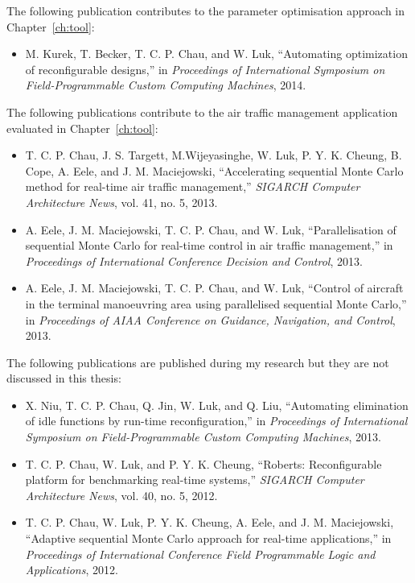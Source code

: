 \begin{publications}
The following publication contributes to the parameter optimisation approach in Chapter~\ref{ch:tool}:
\begin{itemize}
\item M. Kurek, T. Becker, T. C. P. Chau, and W. Luk, ``Automating optimization of reconfigurable designs,'' in \textit{Proceedings of International Symposium on Field-Programmable Custom Computing Machines}, 2014.%
\end{itemize}

\pagebreak
The following publications contribute to the air traffic management application evaluated in Chapter~\ref{ch:tool}:
\begin{itemize}
\item T. C. P. Chau, J. S. Targett, M.Wijeyasinghe, W. Luk, P. Y. K. Cheung, B. Cope, A. Eele, and J. M. Maciejowski, ``Accelerating sequential Monte Carlo method for real-time air traffic management,'' \textit{SIGARCH Computer Architecture News}, vol. 41, no. 5, 2013.
\item A. Eele, J. M. Maciejowski, T. C. P. Chau, and W. Luk, ``Parallelisation of sequential Monte Carlo for real-time control in air traffic management,'' in \textit{Proceedings of International Conference Decision and Control}, 2013.
\item A. Eele, J. M. Maciejowski, T. C. P. Chau, and W. Luk, ``Control of aircraft in the terminal manoeuvring area using parallelised sequential Monte Carlo,'' in \textit{Proceedings of AIAA Conference on Guidance, Navigation, and Control}, 2013.
\end{itemize}

The following publications are published during my research but they are not discussed in this thesis:
\begin{itemize}
\item X. Niu, T. C. P. Chau, Q. Jin, W. Luk, and Q. Liu, ``Automating elimination of idle functions by run-time reconfiguration,'' in \textit{Proceedings of International Symposium on Field-Programmable Custom Computing Machines}, 2013.%
\item T. C. P. Chau, W. Luk, and P. Y. K. Cheung, ``Roberts: Reconfigurable platform for benchmarking real-time systems,'' \textit{SIGARCH Computer Architecture News}, vol. 40, no. 5, 2012.
\item T. C. P. Chau, W. Luk, P. Y. K. Cheung, A. Eele, and J. M. Maciejowski, ``Adaptive sequential Monte Carlo approach for real-time applications,'' in \textit{Proceedings of International Conference Field Programmable Logic and Applications}, 2012.%
\end{itemize}

\end{publications}
